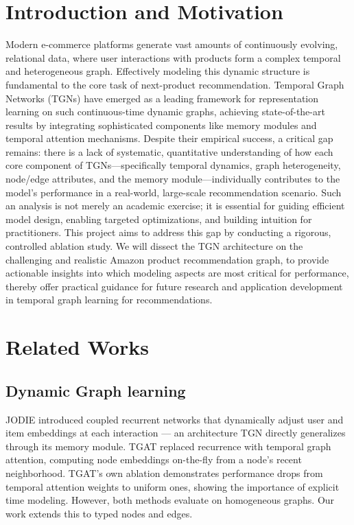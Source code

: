 \documentclass[sigconf]{acmart}
\begin{document}
\section{Introduction and Motivation}
Modern e-commerce platforms generate vast amounts of continuously evolving, relational data, where user interactions with products form a complex temporal and heterogeneous graph. Effectively modeling this dynamic structure is fundamental to the core task of next-product recommendation. Temporal Graph Networks (TGNs) \cite{rossi2020temporal} have emerged as a leading framework for representation learning on such continuous-time dynamic graphs, achieving state-of-the-art results by integrating sophisticated components like memory modules and temporal attention mechanisms. Despite their empirical success, a critical gap remains: there is a lack of systematic, quantitative understanding of how each core component of TGNs---specifically temporal dynamics, graph heterogeneity, node/edge attributes, and the memory module---individually contributes to the model's performance in a real-world, large-scale recommendation scenario. Such an analysis is not merely an academic exercise; it is essential for guiding efficient model design, enabling targeted optimizations, and building intuition for practitioners. This project aims to address this gap by conducting a rigorous, controlled ablation study. We will dissect the TGN architecture on the challenging and realistic Amazon product recommendation graph, to provide actionable insights into which modeling aspects are most critical for performance, thereby offer practical guidance for future research and application development in temporal graph learning for recommendations.

\section{Related Works}

\subsection{Dynamic Graph learning}

JODIE \cite{kumar2019jodie} introduced coupled recurrent networks that dynamically adjust user and item embeddings at each interaction — an architecture TGN directly generalizes through its memory module. TGAT \cite{xu2020tgat} replaced recurrence with temporal graph attention, computing node embeddings on-the-fly from a node's recent neighborhood. TGAT's own ablation demonstrates performance drops from temporal attention weights to uniform ones, showing the importance of explicit time modeling. However, both methods evaluate on homogeneous graphs. Our work extends this to typed nodes and edges.
\end{document}

